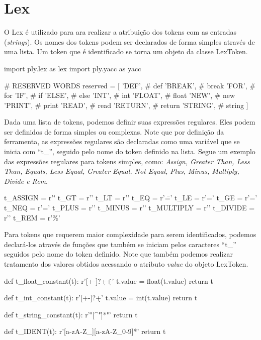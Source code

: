 \documentclass[
	12pt,				%
	openright,			%
	twoside,			%
	a4paper,			%
	english,			%
	french,				%
	spanish,			%
	brazil				%
	]{abntex2}
\begin{document}
\section{Lex}
O Lex é utilizado para ara realizar a atribuição dos tokens com as entradas (\emph{strings}).
Os nomes dos tokens podem ser declarados de forma simples através de uma lista. Um token
que é identificado se torna um objeto da classe LexToken.
\begin{python}
import ply.lex as lex
import ply.yacc as yacc

# RESERVED WORDS
reserved = [
    'DEF',         # def
    'BREAK',       # break
    'FOR',         # for
    'IF',          # if
    'ELSE',        # else
    'INT',         # int
    'FLOAT',       # float
    'NEW',         # new
    'PRINT',       # print
    'READ',        # read
    'RETURN',      # return
    'STRING',      # string
]
\end{python}

	Dada uma lista de tokens, podemos definir suas expressões regulares. Eles podem
ser definidos de forma simples ou complexas. Note que por definição da ferramenta,
as expressões regulares são declaradas como uma variável que se inicia com ``t\_'',
seguido pelo nome do token definido na lista. Segue um exemplo das expressões
regulares para tokens simples, como: \emph{Assign, Greater Than, Less Than, Equals, Less Equal,
Greater Equal, Not Equal, Plus, Minus, Multiply, Divide e Rem}.
\\
\begin{python}
t_ASSIGN = r'\='
t_GT = r'\>'
t_LT = r'\<'
t_EQ = r'\=='
t_LE = r'\<='
t_GE = r'\>='
t_NEQ = r'\!='
t_PLUS = r'\+'
t_MINUS = r'\-'
t_MULTIPLY = r'\*'
t_DIVIDE = r'\/'
t_REM = r'\%'
\end{python}

Para tokens que requerem maior complexidade para serem identificados, podemos declará-los através de funções
que também se iniciam pelos caracteres ``t\_'' seguidos pelo nome do token
definido. Note que também podemos realizar tratamento dos valores obtidos acessando
o atributo \emph{value} do objeto LexToken.
\\
\begin{python}
def t_float_constant(t):
    r'[+-]?\d+\.\d+'
    t.value = float(t.value)
    return t

def t_int_constant(t):
    r'[+-]?\d+'
    t.value = int(t.value)
    return t

def t_string_constant(t):
    r'"[^"\n\r]*"'
    return t

def t_IDENT(t):
    r'[a-zA-Z_][a-zA-Z_0-9]*'
    return t
\end{python}
\newpage
\end{document}

